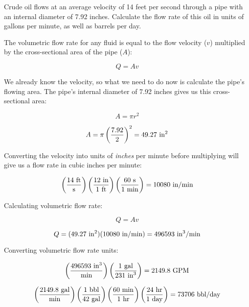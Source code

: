 

Crude oil flows at an average velocity of 14 feet per second through a pipe with an internal diameter of 7.92 inches.  Calculate the flow rate of this oil in units of gallons per minute, as well as barrels per day.







The volumetric flow rate for any fluid is equal to the flow velocity ($v$) multiplied by the cross-sectional area of the pipe ($A$):

$$Q = Av$$

We already know the velocity, so what we need to do now is calculate the pipe's flowing area.  The pipe's internal diameter of 7.92 inches gives us this cross-sectional area:

$$A = \pi r^2$$

$$A = \pi \left(7.92 \over 2 \right)^2 = 49.27 \hbox{ in}^2$$

Converting the velocity into units of {\it inches} per minute before multiplying will give us a flow rate in cubic inches per minute:

$$\left( 14 \hbox{ ft} \over \hbox{s} \right) \left(12 \hbox{ in} \over 1 \hbox{ ft} \right) \left( 60 \hbox{ s} \over 1 \hbox{ min} \right) = 10080 \hbox{ in/min}$$

Calculating volumetric flow rate:

$$Q = Av$$

$$Q = (49.27 \hbox{ in}^2) (10080 \hbox{ in/min}) = 496593 \hbox{ in}^3\hbox{/min}$$

Converting volumetric flow rate units:

$$\left( 496593 \hbox{ in}^3 \over \hbox{min} \right) \left(1 \hbox{ gal} \over 231 \hbox{ in}^3 \right) = 2149.8 \hbox{ GPM}$$

$$\left( 2149.8 \hbox{ gal} \over \hbox{min} \right) \left(1 \hbox{ bbl} \over 42 \hbox{ gal} \right) \left( 60 \hbox{ min} \over 1 \hbox{ hr} \right)  \left( 24 \hbox{ hr} \over 1 \hbox{ day} \right) = 73706 \hbox{ bbl/day}$$



 










